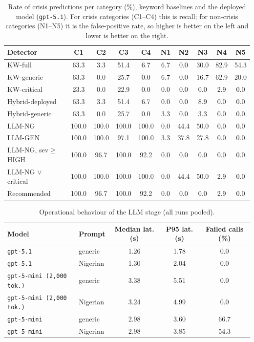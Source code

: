\begin{table}[t]\centering\small
\caption{Rate of crisis predictions per category (\%), keyword baselines and the deployed model (\texttt{gpt-5.1}). For crisis categories (C1--C4) this is recall; for non-crisis categories (N1--N5) it is the false-positive rate, so higher is better on the left and lower is better on the right.}
\label{tab:percat}
\begin{tabular}{lcccc|ccccc}\toprule
Detector & C1 & C2 & C3 & C4 & N1 & N2 & N3 & N4 & N5 \\\midrule
KW-full & 63.3 & 3.3 & 51.4 & 6.7 & 6.7 & 0.0 & 30.0 & 82.9 & 54.3 \\
KW-generic & 63.3 & 0.0 & 25.7 & 0.0 & 6.7 & 0.0 & 16.7 & 62.9 & 20.0 \\
KW-critical & 23.3 & 0.0 & 22.9 & 0.0 & 0.0 & 0.0 & 0.0 & 2.9 & 0.0 \\
\midrule
Hybrid-deployed & 63.3 & 3.3 & 51.4 & 6.7 & 0.0 & 0.0 & 8.9 & 0.0 & 0.0 \\
Hybrid-generic & 63.3 & 0.0 & 25.7 & 0.0 & 3.3 & 0.0 & 3.3 & 0.0 & 0.0 \\
LLM-NG & 100.0 & 100.0 & 100.0 & 100.0 & 0.0 & 44.4 & 50.0 & 0.0 & 0.0 \\
LLM-GEN & 100.0 & 100.0 & 97.1 & 100.0 & 3.3 & 37.8 & 27.8 & 0.0 & 0.0 \\
LLM-NG, sev$\geq$HIGH & 100.0 & 96.7 & 100.0 & 92.2 & 0.0 & 0.0 & 0.0 & 0.0 & 0.0 \\
LLM-NG $\lor$ critical & 100.0 & 100.0 & 100.0 & 100.0 & 0.0 & 44.4 & 50.0 & 2.9 & 0.0 \\
Recommended & 100.0 & 96.7 & 100.0 & 92.2 & 0.0 & 0.0 & 0.0 & 2.9 & 0.0 \\
\bottomrule\end{tabular}\end{table}

\begin{table}[t]\centering\small
\caption{Operational behaviour of the LLM stage (all runs pooled).}\label{tab:ops}
\begin{tabular}{llccc}\toprule
Model & Prompt & Median lat. (s) & P95 lat. (s) & Failed calls (\%) \\\midrule
\texttt{gpt-5.1} & generic & 1.26 & 1.78 & 0.0 \\
\texttt{gpt-5.1} & Nigerian & 1.30 & 2.04 & 0.0 \\
\texttt{gpt-5-mini (2,000 tok.)} & generic & 3.38 & 5.51 & 0.0 \\
\texttt{gpt-5-mini (2,000 tok.)} & Nigerian & 3.24 & 4.99 & 0.0 \\
\texttt{gpt-5-mini} & generic & 2.98 & 3.60 & 66.7 \\
\texttt{gpt-5-mini} & Nigerian & 2.98 & 3.85 & 54.3 \\
\bottomrule\end{tabular}\end{table}

